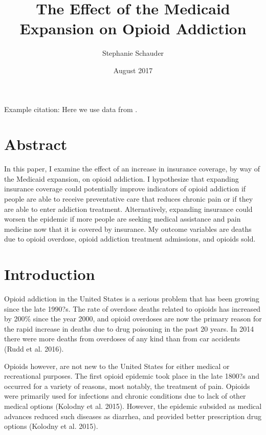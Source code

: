 \documentclass{article}
\title{The Effect of the Medicaid Expansion on Opioid Addiction}
\author{Stephanie Schauder}
\date{August 2017}
\begin{document}
\maketitle



Example citation: Here we use data from \citep{Courtemanche2017}.  

\section{Abstract}

In this paper, I examine the effect of an increase in insurance coverage, by way of the Medicaid expansion, on opioid addiction.  I hypothesize that expanding insurance coverage could potentially improve indicators of opioid addiction if people are able to receive preventative care that reduces chronic pain or if they are able to enter addiction treatment.  Alternatively, expanding insurance could worsen the epidemic if more people are seeking medical assistance and pain medicine now that it is covered by insurance.  My outcome variables are deaths due to opioid overdose, opioid addiction treatment admissions, and opioids sold.



\section{Introduction}
Opioid addiction in the United States is a serious problem that has been growing since the late 1990?s.  The rate of overdose deaths related to opioids has increased by 200\% since the year 2000, and opioid overdoses are now the primary reason for the rapid increase in deaths due to drug poisoning in the past 20 years.  In 2014 there were more deaths from overdoses of any kind than from car accidents (Rudd et al. 2016).  

Opioids however, are not new to the United States for either medical or recreational purposes.  The first opioid epidemic took place in the late 1800?s and occurred for a variety of reasons, most notably, the treatment of pain.  Opioids were primarily used for infections and chronic conditions due to lack of other medical options (Kolodny et al. 2015).  However, the epidemic subsided as medical advances reduced such diseases as diarrhea, and provided better prescription drug options (Kolodny et al. 2015).  
\end{document}
